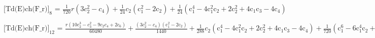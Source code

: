 \documentclass{article}
\newcommand{\unicode}[1]{{}}
\begin{document}
\noindent\(\text{[Td(E)ch(F$\_$r)]}_8\text{ = }\frac{1}{720} r \left(3 c_2^2-c_4\right)+\frac{1}{24} c_2 \left(\text{c$\unicode{02bc}$}_1^2-2 \text{c$\unicode{02bc}$}_2\right)+\frac{1}{24}
\left(\text{c$\unicode{02bc}$}_1^4-4 \text{c$\unicode{02bc}$}_1^2 \text{c$\unicode{02bc}$}_2+2 \text{c$\unicode{02bc}$}_2^2+4 \text{c$\unicode{02bc}$}_1
\text{c$\unicode{02bc}$}_3-4 \text{c$\unicode{02bc}$}_4\right)\)

\noindent\(\text{[Td(E)ch(F$\_$r)]}_{12}\text{ = }\frac{r \left(10 c_2^3-c_3^2-9 c_2 c_4+2 c_6\right)}{60480}+\frac{\left(3 c_2^2-c_4\right) \left(\text{c$\unicode{02bc}$}_1^2-2
\text{c$\unicode{02bc}$}_2\right)}{1440}+\frac{1}{288} c_2 \left(\text{c$\unicode{02bc}$}_1^4-4 \text{c$\unicode{02bc}$}_1^2 \text{c$\unicode{02bc}$}_2+2
\text{c$\unicode{02bc}$}_2^2+4 \text{c$\unicode{02bc}$}_1 \text{c$\unicode{02bc}$}_3-4 \text{c$\unicode{02bc}$}_4\right)+\frac{1}{720} \left(\text{c$\unicode{02bc}$}_1^6-6
\text{c$\unicode{02bc}$}_1^4 \text{c$\unicode{02bc}$}_2+9 \text{c$\unicode{02bc}$}_1^2 \text{c$\unicode{02bc}$}_2^2-2 \text{c$\unicode{02bc}$}_2^3+6
\text{c$\unicode{02bc}$}_1^3 \text{c$\unicode{02bc}$}_3-12 \text{c$\unicode{02bc}$}_1 \text{c$\unicode{02bc}$}_2 \text{c$\unicode{02bc}$}_3+3 \text{c$\unicode{02bc}$}_3^2-6
\text{c$\unicode{02bc}$}_1^2 \text{c$\unicode{02bc}$}_4+6 \text{c$\unicode{02bc}$}_2 \text{c$\unicode{02bc}$}_4+6 \text{c$\unicode{02bc}$}_1 \text{c$\unicode{02bc}$}_5-6
\text{c$\unicode{02bc}$}_6\right)\)
\end{document}
